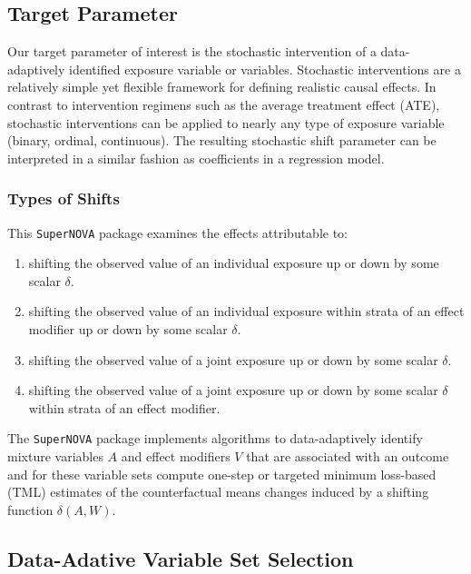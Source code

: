 \documentclass[
]{article}
\providecommand{\tightlist}{%
  \setlength{\itemsep}{0pt}\setlength{\parskip}{0pt}}
\begin{document}
\hypertarget{target-parameter}{%
\subsection{Target Parameter}\label{target-parameter}}

Our target parameter of interest is the stochastic intervention of a
data-adaptively identified exposure variable or variables. Stochastic
interventions are a relatively simple yet flexible framework for
defining realistic causal effects. In contrast to intervention regimens
such as the average treatment effect (ATE), stochastic interventions can
be applied to nearly any type of exposure variable (binary, ordinal,
continuous). The resulting stochastic shift parameter can be interpreted
in a similar fashion as coefficients in a regression model.

\hypertarget{types-of-shifts}{%
\subsubsection{Types of Shifts}\label{types-of-shifts}}

This \texttt{SuperNOVA} package examines the effects attributable to:

\begin{enumerate}
\def\labelenumi{\arabic{enumi}.}
\tightlist
\item
  shifting the observed value of an individual exposure up or down by
  some scalar \(\delta\).
\item
  shifting the observed value of an individual exposure within strata of
  an effect modifier up or down by some scalar \(\delta\).
\item
  shifting the observed value of a joint exposure up or down by some
  scalar \(\delta\).
\item
  shifting the observed value of a joint exposure up or down by some
  scalar \(\delta\) within strata of an effect modifier.
\end{enumerate}

The \texttt{SuperNOVA} package implements algorithms to data-adaptively
identify mixture variables \(A\) and effect modifiers \(V\) that are
associated with an outcome and for these variable sets compute one-step
or targeted minimum loss-based (TML) estimates of the counterfactual
means changes induced by a shifting function \(\delta(A,W)\).

\hypertarget{data-adative-variable-set-selection}{%
\subsection{Data-Adative Variable Set
Selection}\label{data-adative-variable-set-selection}}
\end{document}
